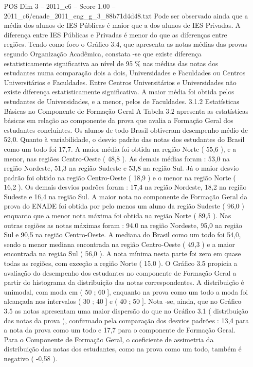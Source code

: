 \begin{textsample}{POS Dim 3 – 2011\_c6 – Score 1.00 – 2011\_c6/enade\_2011\_eng\_g\_3\_88b71d4d48.txt}
Pode ser observado ainda que a média dos alunos de IES Públicas é maior que a dos alunos de IES Privadas.
A diferença entre IES Públicas e Privadas é menor do que as diferenças entre regiões.
Tendo como foco o Gráfico 3.4, que apresenta as notas médias das provas segundo Organização Acadêmica, constata -se que existe diferença estatisticamente significativa ao nível de 95 \% nas médias das notas dos estudantes numa comparação dois a dois, Universidades e Faculdades ou Centros Universitários e Faculdades.
Entre Centros Universitários e Universidades não existe diferença estatisticamente significativa.
A maior média foi obtida pelos estudantes de Universidades, e a menor, pelos de Faculdades. 3.1.2 Estatísticas Básicas no Componente de Formação Geral A Tabela 3.2 apresenta as estatísticas básicas em relação ao componente da prova que avalia a Formação Geral dos estudantes concluintes.
Os alunos de todo Brasil obtiveram desempenho médio de 52,0.
Quanto à variabilidade, o desvio padrão das notas dos estudantes do Brasil como um todo foi 17,7.
A maior média foi obtida na região Norte ( 55,6 ), e a menor, nas regiões Centro-Oeste ( 48,8 ).
As demais médias foram : 53,0 na região Nordeste, 51,3 na região Sudeste e 53,8 na região Sul.
Já o maior desvio padrão foi obtido na região Centro-Oeste ( 18,9 ) e o menor na região Norte ( 16,2 ).
Os demais desvios padrões foram : 17,4 na região Nordeste, 18,2 na região Sudeste e 16,4 na região Sul.
A maior nota no componente de Formação Geral da prova do ENADE foi obtida por pelo menos um aluno da região Sudeste ( 96,0 ) enquanto que a menor nota máxima foi obtida na região Norte ( 89,5 ).
Nas outras regiões as notas máximas foram : 94,0 na região Nordeste, 95,0 na região Sul e 90,5 na região Centro-Oeste.
A mediana do Brasil como um todo foi 54,0, sendo a menor mediana encontrada na região Centro-Oeste ( 49,3 ) e a maior encontrada na região Sul ( 56,0 ).
A nota mínima nesta parte foi zero em quase todas as regiões, com exceção a região Norte ( 15,0 ).
O Gráfico 3.5 propicia a avaliação do desempenho dos estudantes no componente de Formação Geral a partir do histograma da distribuição das notas correspondentes.
A distribuição é unimodal, com moda em ( 50 ; 60 ], enquanto na prova como um todo a moda foi alcançada nos intervalos ( 30 ; 40 ] e ( 40 ; 50 ].
Nota -se, ainda, que no Gráfico 3.5 as notas apresentam uma maior dispersão do que no Gráfico 3.1 ( distribuição das notas da prova ), confirmado pela comparação dos desvios padrões : 13,4 para a nota da prova como um todo e 17,7 para o componente de Formação Geral.
Para o Componente de Formação Geral, o coeficiente de assimetria da distribuição das notas dos estudantes, como na prova como um todo, também é negativo ( -0,58 ).

\end{textsample}
